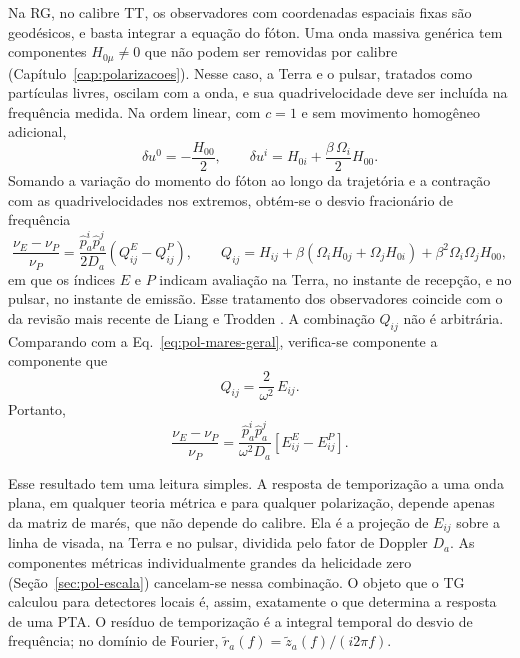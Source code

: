 Na RG, no calibre TT, os observadores com coordenadas espaciais fixas
são geodésicos, e basta integrar a equação do fóton. Uma onda massiva
genérica tem componentes $H_{0\mu}\neq0$ que não podem ser removidas por
calibre (Capítulo~\ref{cap:polarizacoes}). Nesse caso, a Terra e o
pulsar, tratados como partículas livres, oscilam com a onda, e sua
quadrivelocidade deve ser incluída na frequência medida. Na ordem
linear, com $c=1$ e sem movimento homogêneo adicional,
\begin{equation}
 \delta u^0=-\frac{H_{00}}{2},\qquad
 \delta u^i=H_{0i}+\frac{\beta\,\Omega_i}{2}H_{00}.
 \label{eq:pta-observadores}
\end{equation}
Somando a variação do momento do fóton ao longo da trajetória e a
contração com as quadrivelocidades nos extremos, obtém-se o desvio
fracionário de frequência
\begin{equation}
 \frac{\nu_E-\nu_P}{\nu_P}
 =\frac{\hat p_a^i\hat p_a^j}{2D_a}\left(Q_{ij}^{E}-Q_{ij}^{P}\right),
 \qquad
 Q_{ij}=H_{ij}+\beta(\Omega_iH_{0j}+\Omega_jH_{0i})
 +\beta^2\Omega_i\Omega_jH_{00},
 \label{eq:pta-redshift}
\end{equation}
em que os índices $E$ e $P$ indicam avaliação na Terra, no instante de
recepção, e no pulsar, no instante de emissão. Esse tratamento dos
observadores coincide com o da revisão mais recente de Liang e Trodden
\autocite{liang2021}. A combinação $Q_{ij}$ não é arbitrária. Comparando
com a Eq.~\eqref{eq:pol-mares-geral}, verifica-se componente a
componente que
\begin{equation}
 Q_{ij}=\frac{2}{\omega^2}\,E_{ij}.
 \label{eq:pta-Q-mares}
\end{equation}
Portanto,
\begin{equation}
 \boxed{\;
 \frac{\nu_E-\nu_P}{\nu_P}
 =\frac{\hat p_a^i\hat p_a^j}{\omega^2D_a}
 \left[E_{ij}^{E}-E_{ij}^{P}\right].\;}
 \label{eq:pta-redshift-mares}
\end{equation}

Esse resultado tem uma leitura simples. A resposta de temporização a
uma onda plana, em qualquer teoria métrica e para qualquer polarização,
depende apenas da matriz de marés, que não depende do calibre. Ela é a
projeção de $E_{ij}$ sobre a linha de visada, na Terra e no pulsar,
dividida pelo fator de Doppler $D_a$. As componentes métricas
individualmente grandes da helicidade zero
(Seção~\ref{sec:pol-escala}) cancelam-se nessa combinação. O objeto que
o TG calculou para detectores locais é, assim, exatamente o que
determina a resposta de uma PTA. O resíduo de temporização é a integral
temporal do desvio de frequência; no domínio de Fourier,
$\tilde r_a(f)=\tilde z_a(f)/(i2\pi f)$.

